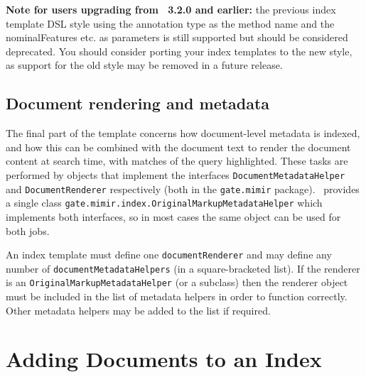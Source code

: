 {\bf Note for users upgrading from \Mimir\ 3.2.0 and earlier:} the previous
index template DSL style using the annotation type as the method name and the
nominalFeatures etc. as parameters is still supported but should be considered
deprecated.  You should consider porting your index templates to the new style,
as support for the old style may be removed in a future release.

\subsection*{Document rendering and metadata}

The final part of the template concerns how document-level metadata is indexed,
and how this can be combined with the document text to render the document
content at search time, with matches of the query highlighted.  These tasks are
performed by objects that implement the interfaces
\lstinline!DocumentMetadataHelper! and \lstinline!DocumentRenderer!
respectively (both in the \lstinline!gate.mimir! package). \Mimir\ provides a
single class \lstinline!gate.mimir.index.OriginalMarkupMetadataHelper!
which implements both interfaces, so in most cases the same object can be used
for both jobs.

An index template must define one \lstinline!documentRenderer! and may define
any number of \lstinline!documentMetadataHelpers! (in a square-bracketed list).
If the renderer is an \lstinline!OriginalMarkupMetadataHelper! (or a subclass)
then the renderer object must be included in the list of metadata helpers in
order to function correctly.  Other metadata helpers may be added to the list
if required.

\section{Adding Documents to an Index}\label{sec:indexing:add-docs}

